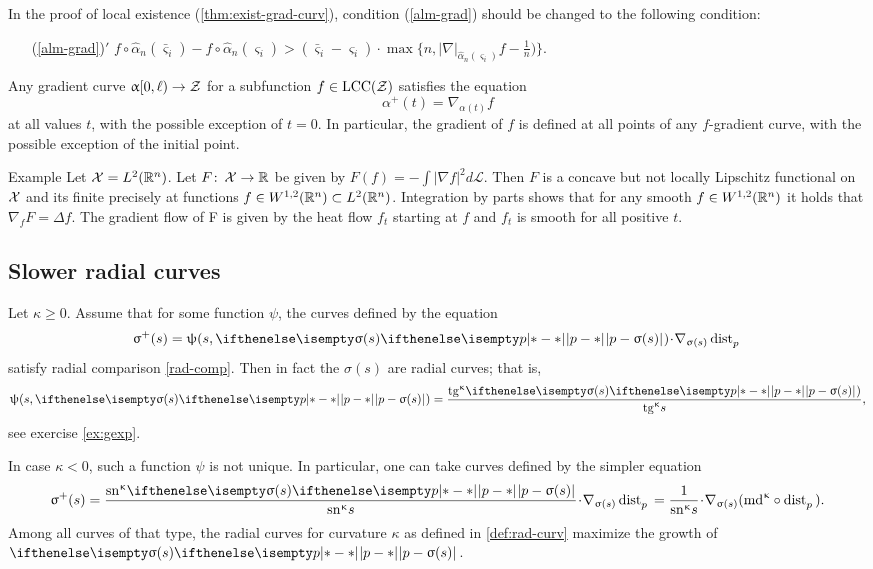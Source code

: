 \medskip

In the proof of local existence (\ref{thm:exist-grad-curv}), condition (\ref{alm-grad})
should be changed to the following condition:
\begin{itemize}

\item[{(\ref{alm-grad})}$'$]
$f\circ\hat\alpha_n(\bar\varsigma_i)-f\circ\hat\alpha_n(\varsigma_i)
>
(\bar\varsigma_i-\varsigma_i)
\cdot
\max\{n,|\nabla|_{\hat\alpha_n(\varsigma_i)}f-\tfrac{1}{n})\}.$
\end{itemize}

Any gradient curve $\alpha[0,\ell)\to\spc{Z}$
for a subfunction
$f\in \LSCSC(\spc{Z})$
satisfies the equation
\[\alpha^+(t)=\nabla_{\alpha(t)} f\]
at all values $t$, with the possible exception of $t=0$.
In particular, the gradient of $f$ is defined at all points of any 
$f$-gradient curve, with the possible exception of the initial point.

\begin{thm}{Example}
Let $\mathcal{X}=L^2(\mathbb{R}^n)$. Let $F\co \spc{X}\to \R$ be given  by $F(f)=-\int|\nabla f|^2d\mathcal L$.
Then $F$ is a concave but not locally Lipschitz functional on $\mathcal{X}$ and its finite precisely at functions $f\in W^{1,2}(\R^n)\subset L^2(\R^n)$.
Integration by parts shows that for any smooth $f\in W^{1,2}(\R^n)$ it holds that $\nabla_fF=\Delta f$.
The gradient flow of F is given by the heat flow $f_t$ starting at $f$ and $f_t$ is smooth for all positive $t$.
\end{thm}

\subsection*{Slower radial curves}
Let $\kappa\ge 0$. 
Assume that for some function $\psi$, the curves defined by the equation 
\[\sigma^+(s)=\psi(s,\dist{p}{\sigma(s)}{})\cdot\nabla_{\sigma(s)}\distfun{p}{}{}\]
satisfy radial comparison \ref{rad-comp}.
Then in fact the $\sigma(s)$ are radial curves; 
that is, 
\[\psi(s,\dist{p}{\sigma(s)}{})= \frac{\tg\kappa\dist[{{}}]{p}{\sigma(s)}{})}{\tg\kappa s},\]
see exercise \ref{ex:gexp}.

In case $\kappa<0$, such a function $\psi$ is not unique.
In particular, one can take curves defined by the simpler equation
\[\sigma^+(s)
=
\frac{\sn\kappa \dist[{{}}]{p}{\sigma(s)}{}}{\sn\kappa s}\cdot\nabla_{\sigma(s)}\distfun{p}{}{}
=
\frac{1}{\sn\kappa s}\cdot\nabla_{\sigma(s)}(\md\kappa\circ\distfun{p}{}{}).\]
Among all curves of that type, the radial curves for curvature $\kappa$ 
as defined in \ref{def:rad-curv} maximize the growth of $\dist{p}{\sigma(s)}{}$.




